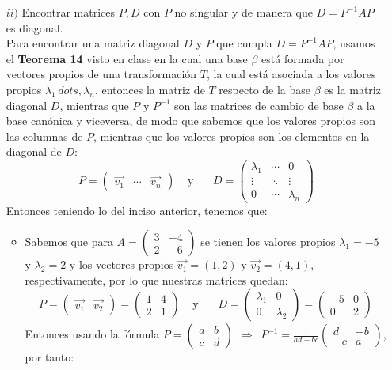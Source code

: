 \begin{itemize}
\begin{enumerate}
\begin{itemize}
    
\end{itemize}
    \end{enumerate}
    \item[$ii)$] Encontrar matrices $P,D$ con $P$ no singular y de manera que $D = P^{-1}AP$ es diagonal.\\
    Para encontrar una matriz diagonal $D$ y $P$ que cumpla $D = P^{-1}AP$, usamos el \textbf{Teorema 14} visto en clase en la cual una base $\beta$ est\'a formada por vectores propios de una transformaci\'on $T$, la cual est\'a asociada a los valores propios $\lambda_1\,dots,\lambda_n$, entonces la matriz de $T$ respecto de la base $\beta$ es la matriz diagonal $D$, mientras que $P$ y $P^{-1}$ son las matrices de cambio de base $\beta$ a la base can\'onica y viceversa, de modo que sabemos que los valores propios son las columnas de $P$, mientras que los valores propios son los elementos en la diagonal de $D$:
    \[P=\begin{pmatrix}\vec{v_1}&\cdots&\vec{v_n}\end{pmatrix}~~~~~\text{y}~~~~~~~~D=\begin{pmatrix}\lambda_1&\cdots&0\\ \vdots&\ddots&\vdots\\0&\cdots&\lambda_n\end{pmatrix}\]
    Entonces teniendo lo del inciso anterior, tenemos que:
    \begin{itemize}
        \item Sabemos que para $\displaystyle A= \begin{pmatrix}
3 &-4\\
2 &-6
\end{pmatrix}$ se tienen los valores propios $\lambda_1=-5$ y $\lambda_2=2$ y los vectores propios $\vec{v_1}=(1,2)$ y $\vec{v_2}=(4,1)$, respectivamente, por lo que nuestras matrices quedan:
\[P=\begin{pmatrix}\vec{v_1}&\vec{v_2}\end{pmatrix}=\begin{pmatrix}1&4\\2&1\end{pmatrix}~~~~~\text{y}~~~~~~~~D=\begin{pmatrix}\lambda_1&0\\0&\lambda_2\end{pmatrix}=\begin{pmatrix}-5&0\\0&2\end{pmatrix}\]
Entonces usando la f\'ormula $\displaystyle P=\begin{pmatrix}a&b\\c&d\end{pmatrix}~~\Longrightarrow~~P^{-1}=\frac{1}{ad-bc}\begin{pmatrix}d&-b\\-c&a\end{pmatrix}$, por tanto:

\end{itemize}
\end{itemize}
